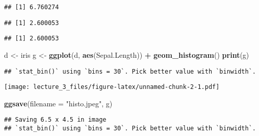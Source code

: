 \documentclass[]{article}
\newenvironment{Shaded}{\begin{snugshade}}{\end{snugshade}}
\newcommand{\DataTypeTok}[1]{\textcolor[rgb]{0.13,0.29,0.53}{#1}}
\newcommand{\KeywordTok}[1]{\textcolor[rgb]{0.13,0.29,0.53}{\textbf{#1}}}
\newcommand{\NormalTok}[1]{#1}
\newcommand{\OperatorTok}[1]{\textcolor[rgb]{0.81,0.36,0.00}{\textbf{#1}}}
\newcommand{\StringTok}[1]{\textcolor[rgb]{0.31,0.60,0.02}{#1}}
\begin{document}
\begin{verbatim}
## [1] 6.760274
\end{verbatim}

\begin{Shaded}
\end{Shaded}

\begin{verbatim}
## [1] 2.600053
\end{verbatim}

\begin{Shaded}
\end{Shaded}

\begin{verbatim}
## [1] 2.600053
\end{verbatim}

\begin{Shaded}
\begin{Highlighting}[]
\NormalTok{d <-}\StringTok{ }\NormalTok{iris}
\NormalTok{g <-}\StringTok{ }\KeywordTok{ggplot}\NormalTok{(d, }\KeywordTok{aes}\NormalTok{(Sepal.Length)) }\OperatorTok{+}\StringTok{ }\KeywordTok{geom_histogram}\NormalTok{()}
\KeywordTok{print}\NormalTok{(g)}
\end{Highlighting}
\end{Shaded}

\begin{verbatim}
## `stat_bin()` using `bins = 30`. Pick better value with `binwidth`.
\end{verbatim}

\texttt{[image: lecture\_3\_files/figure-latex/unnamed-chunk-2-1.pdf]}

\begin{Shaded}
\begin{Highlighting}[]
\KeywordTok{ggsave}\NormalTok{(}\DataTypeTok{filename =} \StringTok{"histo.jpeg"}\NormalTok{, g)}
\end{Highlighting}
\end{Shaded}

\begin{verbatim}
## Saving 6.5 x 4.5 in image
## `stat_bin()` using `bins = 30`. Pick better value with `binwidth`.
\end{verbatim}
\end{document}
